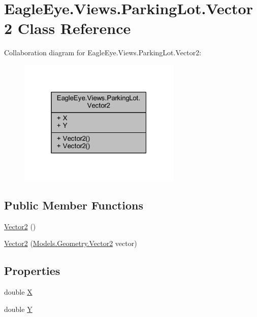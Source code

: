 \hypertarget{class_eagle_eye_1_1_views_1_1_parking_lot_1_1_vector2}{}\section{Eagle\+Eye.\+Views.\+Parking\+Lot.\+Vector2 Class Reference}
\label{class_eagle_eye_1_1_views_1_1_parking_lot_1_1_vector2}


Collaboration diagram for Eagle\+Eye.\+Views.\+Parking\+Lot.\+Vector2\+:\nopagebreak
\begin{figure}[H]
\begin{center}
\leavevmode
\includegraphics[width=220pt]{class_eagle_eye_1_1_views_1_1_parking_lot_1_1_vector2__coll__graph}
\end{center}
\end{figure}
\subsection*{Public Member Functions}
\begin{DoxyCompactItemize}
\item 
\mbox{\hyperlink{class_eagle_eye_1_1_views_1_1_parking_lot_1_1_vector2_a7ad4985eae411d4785f7da5964fafa8c}{Vector2}} ()
\item 
\mbox{\hyperlink{class_eagle_eye_1_1_views_1_1_parking_lot_1_1_vector2_a09d06dd70916e05a76b0da35718ba02c}{Vector2}} (\mbox{\hyperlink{struct_eagle_eye_1_1_models_1_1_geometry_1_1_vector2}{Models.\+Geometry.\+Vector2}} vector)
\end{DoxyCompactItemize}
\subsection*{Properties}
\begin{DoxyCompactItemize}
\item 
double \mbox{\hyperlink{class_eagle_eye_1_1_views_1_1_parking_lot_1_1_vector2_a55e65b3a51370ae1c14539d818309ead}{X}}
\item 
double \mbox{\hyperlink{class_eagle_eye_1_1_views_1_1_parking_lot_1_1_vector2_aac35e7838fd7858b43c98df7e7d3c483}{Y}}
\end{DoxyCompactItemize}


